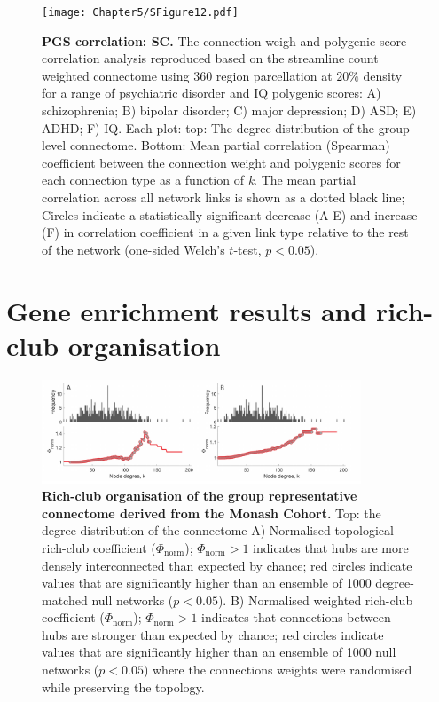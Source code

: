 \begin{figure}[h!]
\begin{center}
\texttt{[image: Chapter5/SFigure12.pdf]}%
\end{center}
\caption{\textbf{PGS correlation: SC.}
The connection weigh and polygenic score correlation analysis reproduced based on the streamline count weighted connectome using 360 region parcellation at $20\%$ density for a range of psychiatric disorder and IQ polygenic scores: A) schizophrenia; B) bipolar disorder; C) major depression; D) ASD; E) ADHD; F) IQ. Each plot: top: The degree distribution of the group-level connectome. Bottom: Mean partial correlation (Spearman) coefficient between the connection weight and polygenic scores for each connection type as a function of \textit{k}. The mean partial correlation across all network links is shown as a dotted black line; Circles indicate a statistically significant decrease (A-E) and increase (F) in correlation coefficient in a given link type relative to the rest of the network (one-sided Welch's $t$-test, $p < 0.05$). }
\label{fig:Ch5SFig12}
\end{figure}

\clearpage
\section{Gene enrichment results and rich-club organisation}
\label{app:AppendixCh5_3}

\begin{figure}[h!]
\begin{center}
\includegraphics[width=0.85\textwidth]{Chapter5/SFigure13.pdf}%
\end{center}
\caption{\textbf{Rich-club organisation of the group representative connectome derived from the Monash Cohort.} Top: the degree distribution of the connectome A) Normalised topological rich-club coefficient ($\Phi_\mathrm{{norm}}$); $\Phi_\mathrm{{norm}}>1$ indicates that hubs are more densely interconnected than expected by chance; red circles indicate values that are significantly higher than an ensemble of 1000 degree-matched null networks ($p<0.05$). B) Normalised weighted rich-club coefficient ($\Phi_\mathrm{{norm}}$); $\Phi_\mathrm{{norm}}>1$ indicates that connections between hubs are stronger than expected by chance; red circles indicate values that are significantly higher than an ensemble of 1000 null networks ($p<0.05$) where the connections weights were randomised while preserving the topology. }
\label{fig:Ch5SFig13}
\end{figure}


